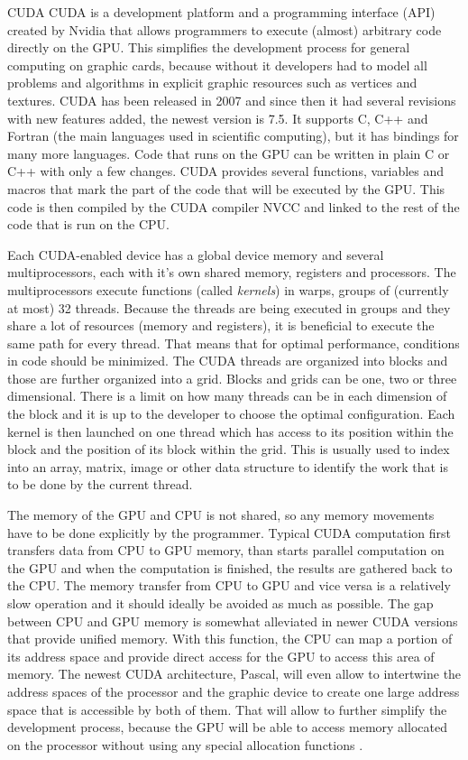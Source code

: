 \documentclass[a4paper,12pt,notitlepage,oneside]{article}
\newcommand{\parspace}[1][]{
	\ifthenelse{\isempty{#1}}{\vspace{5mm}}{\vspace{#1}}
	\par
}
\begin{document}
\begin{section}{CUDA}
CUDA is a development platform and a programming interface (API) created by Nvidia that allows programmers to execute (almost) arbitrary code directly on the
GPU. This simplifies the development process for general computing on graphic cards, because without it developers had to model all problems and algorithms
in explicit graphic resources such as vertices and textures. CUDA has been released in 2007 and since then it had several revisions with new features added, the newest version is 7.5. It supports C, C++ and Fortran (the main languages used in scientific computing), but it has bindings for many more languages.
Code that runs on the GPU can be written in plain C or C++ with only a few changes. CUDA provides several functions, variables and macros that mark the part
of the code that will be executed by the GPU. This code is then compiled by the CUDA compiler NVCC and linked to the rest of the code that is run on the CPU.

\parspace Each CUDA-enabled device has a global device memory and several multiprocessors, each with it's own shared memory, registers and processors.
The multiprocessors execute functions (called \textit{kernels}) in warps, groups of (currently at most) 32 threads.
Because the threads are being executed in groups and they share a lot of resources (memory and registers), it is beneficial to execute the same path for every thread. That means that for optimal performance,
conditions in code should be minimized. The CUDA threads are organized into blocks and those are further organized into a grid. Blocks and grids can be
one, two or three dimensional. There is a limit on how many threads can be in each dimension of the block and it is up to the developer to choose the optimal
configuration. Each kernel is then launched on one thread which has access to its position within the block and the position of its block within the grid.
This is usually used to index into an array, matrix, image or other data structure to identify the work that is to be done by the current thread.

\parspace The memory of the GPU and CPU is not shared, so any memory movements have to be done explicitly by the programmer.
Typical CUDA computation first transfers data from CPU to GPU memory, than starts parallel computation on the GPU and when the computation is finished,
the results are gathered back to the CPU. The memory transfer from CPU to GPU and vice versa is a relatively slow operation and it should ideally be avoided as
much as possible. The gap between CPU and GPU memory is somewhat alleviated in newer CUDA versions that provide unified memory. With this function, the CPU
can map a portion of its address space and provide direct access for the GPU to access this area of memory. The newest CUDA architecture, Pascal, will even
allow to intertwine the address spaces of the processor and the graphic device to create one large address space that is accessible by both of them. That will
allow to further simplify the development process, because the GPU will be able to access memory allocated on the processor without using any special
allocation functions \cite{CUDAPascal}.
\end{section}
\end{document}
